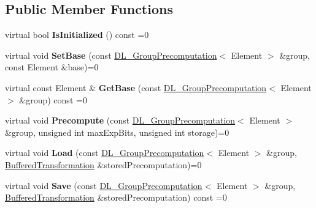 \subsection*{Public Member Functions}
\begin{DoxyCompactItemize}
\item 
\hypertarget{class_d_l___fixed_base_precomputation_af3d9c16b963bfbb7e931809278f87185}{
virtual bool {\bfseries IsInitialized} () const =0}
\label{class_d_l___fixed_base_precomputation_af3d9c16b963bfbb7e931809278f87185}

\item 
\hypertarget{class_d_l___fixed_base_precomputation_a5e0a929c25a9d6035abd57f7b26685f3}{
virtual void {\bfseries SetBase} (const \hyperlink{class_d_l___group_precomputation}{DL\_\-GroupPrecomputation}$<$ Element $>$ \&group, const Element \&base)=0}
\label{class_d_l___fixed_base_precomputation_a5e0a929c25a9d6035abd57f7b26685f3}

\item 
\hypertarget{class_d_l___fixed_base_precomputation_a3bd10f56a621c1a828a3f9eeaac19075}{
virtual const Element \& {\bfseries GetBase} (const \hyperlink{class_d_l___group_precomputation}{DL\_\-GroupPrecomputation}$<$ Element $>$ \&group) const =0}
\label{class_d_l___fixed_base_precomputation_a3bd10f56a621c1a828a3f9eeaac19075}

\item 
\hypertarget{class_d_l___fixed_base_precomputation_ab1e4f72616dc91d0a9629e97c21c643e}{
virtual void {\bfseries Precompute} (const \hyperlink{class_d_l___group_precomputation}{DL\_\-GroupPrecomputation}$<$ Element $>$ \&group, unsigned int maxExpBits, unsigned int storage)=0}
\label{class_d_l___fixed_base_precomputation_ab1e4f72616dc91d0a9629e97c21c643e}

\item 
\hypertarget{class_d_l___fixed_base_precomputation_afae968910cd467ec807f14c858045b5b}{
virtual void {\bfseries Load} (const \hyperlink{class_d_l___group_precomputation}{DL\_\-GroupPrecomputation}$<$ Element $>$ \&group, \hyperlink{class_buffered_transformation}{BufferedTransformation} \&storedPrecomputation)=0}
\label{class_d_l___fixed_base_precomputation_afae968910cd467ec807f14c858045b5b}

\item 
\hypertarget{class_d_l___fixed_base_precomputation_a2d1ac13f18ad0df31e9b269f1bdc4ac7}{
virtual void {\bfseries Save} (const \hyperlink{class_d_l___group_precomputation}{DL\_\-GroupPrecomputation}$<$ Element $>$ \&group, \hyperlink{class_buffered_transformation}{BufferedTransformation} \&storedPrecomputation) const =0}
\label{class_d_l___fixed_base_precomputation_a2d1ac13f18ad0df31e9b269f1bdc4ac7}


\end{DoxyCompactItemize}
